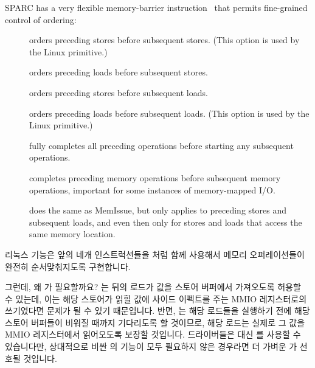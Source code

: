 SPARC has a very flexible memory-barrier instruction~\cite{SPARC94}
that permits fine-grained control of ordering:
\begin{description}
\item	[] orders preceding stores before subsequent stores.
	(This option is used by the Linux  primitive.)
\item	[] orders preceding loads before subsequent stores.
\item	[] orders preceding stores before subsequent loads.
\item	[] orders preceding loads before subsequent loads.
	(This option is used by the Linux  primitive.)
\item	[] fully completes all preceding operations before starting
	any subsequent operations.
\item	[] completes preceding memory operations before subsequent
	memory operations, important for some instances of memory-mapped
	I/O.
\item	[] does the same as MemIssue,
	but only applies to preceding stores
	and subsequent loads, and even then only for stores and loads that
	access the same memory location.
\end{description}
\fi

리눅스  기능은 앞의 네개 인스트럭션들을
 처럼
함께 사용해서 메모리 오퍼레이션들이 완전히 순서맞춰지도록 구현합니다.

그런데, 왜  가 필요할까요?
 는 뒤의 로드가 값을 스토어 버퍼에서 가져오도록 허용할
수 있는데, 이는 해당 스토어가 읽힐 값에 사이드 이펙트를 주는 MMIO 레지스터로의
쓰기였다면 문제가 될 수 있기 때문입니다.
반면,  는 해당 로드들을 실행하기 전에 해당 스토어
버퍼들이 비워질 때까지 기다리도록 할 것이므로, 해당 로드는 실제로 그 값을 MMIO
레지스터에서 읽어오도록 보장할 것입니다.
드라이버들은 대신  를 사용할 수 있습니다만, 상대적으로 비싼
 의 기능이 모두 필요하지 않은 경우라면 더 가벼운
 가 선호될 것입니다.

